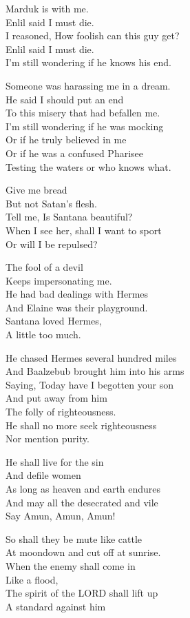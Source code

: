 \documentclass[
]{book}
\begin{document}
Marduk is with me.\\
Enlil said I must die.\\
I reasoned, How foolish can this guy get?\\
Enlil said I must die.\\
I'm still wondering if he knows his end.

Someone was harassing me in a dream.\\
He said I should put an end\\
To this misery that had befallen me.\\
I'm still wondering if he was mocking\\
Or if he truly believed in me\\
Or if he was a confused Pharisee\\
Testing the waters or who knows what.

Give me bread\\
But not Satan's flesh.\\
Tell me, Is Santana beautiful?\\
When I see her, shall I want to sport\\
Or will I be repulsed?

The fool of a devil\\
Keeps impersonating me.\\
He had bad dealings with Hermes\\
And Elaine was their playground.\\
Santana loved Hermes,\\
A little too much.

He chased Hermes several hundred miles\\
And Baalzebub brought him into his arms\\
Saying, Today have I begotten your son\\
And put away from him\\
The folly of righteousness.\\
He shall no more seek righteousness\\
Nor mention purity.

He shall live for the sin\\
And defile women\\
As long as heaven and earth endures\\
And may all the desecrated and vile\\
Say Amun, Amun, Amun!

So shall they be mute like cattle\\
At moondown and cut off at sunrise.\\
When the enemy shall come in\\
Like a flood,\\
The spirit of the LORD shall lift up\\
A standard against him
\end{document}
